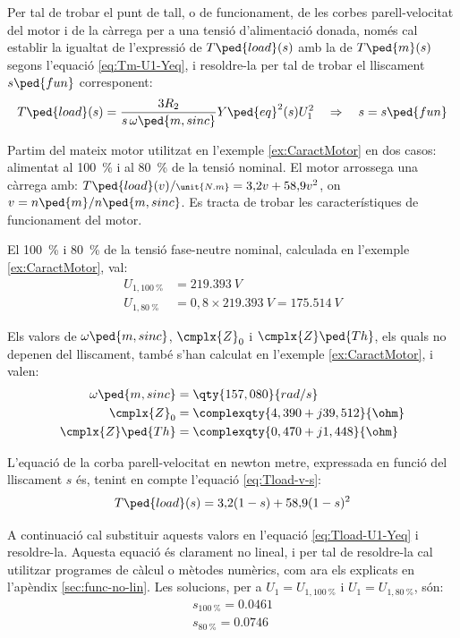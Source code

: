 Per tal de trobar el punt de tall, o de funcionament, de les corbes parell-velocitat del motor i de la càrrega per a una tensió d'alimentació donada, només cal establir la igualtat de l'expressió de $T\ped{load}(s)$ amb la de $T\ped{m}(s)$ segons l'equació \eqref{eq:Tm-U1-Yeq}, i resoldre-la per tal de trobar el lliscament $s\ped{fun}$ corresponent:
\begin{equation}\label{eq:Tload-U1-Yeq}
	T\ped{load}(s) = \frac{3 R_2}{s\,\omega\ped{m,sinc}} Y\ped{eq}^2(s) U_1^2 \quad\Rightarrow \quad s=s\ped{fun}
\end{equation}


\begin{exemple}\label{ex:MotTensRedSolEx}
	\addcontentsxms{\MotTensRedSolEx}
	Partim del mateix motor utilitzat en l'exemple \vref{ex:CaractMotor} en dos casos: alimentat al \qty{100}{\%} i al \qty{80}{\%} de la tensió nominal. El motor arrossega una càrrega amb: $T\ped{load}(v) /{\scriptstyle \unit{N.m}} = 3{,}2 v + 58{,}9 v^2$, on $v = n\ped{m}/n\ped{m,sinc}$. Es tracta de trobar les característiques de funcionament del motor.
	
	El \qty{100}{\%} i \qty{80}{\%} de la tensió fase-neutre nominal, calculada  en l'exemple \ref{ex:CaractMotor}, val:
	\begin{align*}
		U_{1,\qty{100}{\%}} &= \qty{219,393}{V} \\
		U_{1,\qty{80}{\%}} &= 0{,}8\times\qty{219,393}{V} = \qty{175,514}{V}
	\end{align*}

	Els valors de $\omega\ped{m,sinc}$, $\cmplx{Z}_0$ i  $\cmplx{Z}\ped{Th}$, els quals no depenen del lliscament, també s'han calculat en  l'exemple \ref{ex:CaractMotor}, i valen:
	\vspace{-2mm}
	\begin{align*}
		\omega\ped{m,sinc} &=  \qty{157,080}{rad/s} \\
		\cmplx{Z}_0 &=  \complexqty{4,390+j39,512}{\ohm} \\
		\cmplx{Z}\ped{Th} &= \complexqty{0,470+j1,448}{\ohm} 
	\end{align*}
	
	L'equació de la corba parell-velocitat en newton metre, expressada en funció del lliscament $s$ és, tenint en compte l'equació \eqref{eq:Tload-v-s}:
	\[
		T\ped{load}(s) = 3{,}2 (1-s) + 58{,}9 (1-s)^2
	\]

	A continuació cal substituir aquests valors en l'equació \eqref{eq:Tload-U1-Yeq} i resoldre-la. Aquesta equació és clarament no lineal, i per tal de resoldre-la cal utilitzar programes de càlcul o mètodes numèrics, com ara els explicats en l'apèndix \ref{sec:func-no-lin}. Les solucions, per a $U_1=U_{1,\qty{100}{\%}}$ i $U_1=U_{1,\qty{80}{\%}}$, són:
	\begin{align*}
		s_{\qty{100}{\%}} = \num{0,0461} \\
	 	s_{\qty{80}{\%}}= \num{0,0746}
	\end{align*}	
	

\end{exemple}
